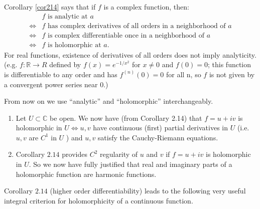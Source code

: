 \documentclass[egregdoesnotlikesansseriftitles,a4paper]{scrartcl}
\begin{document}
Corollary \ref{cor214} says that if $f$ is a complex function, then:
\begin{align*}
     & f\text{ is analytic at } a\\
     \iff & f \text{ has complex derivatives of all orders in a
     neighborhood of } a\\
     \iff & f \text{ is complex differentiable once in a
     neighborhood of } a\\
     \iff & f \text{ is holomorphic at } a.
\end{align*}
For real functions, existence of derivatives of all orders does not imply analyticity.
(e.g. $f: \mathbb{R}\rightarrow R$ defined by $f (x)=e^{-1/x^2}$ for $x \neq 0$ and $f (0)=0$; this function is differentiable to any order and has $f^{(n)}(0)=0$ for all n, so $f$ is not given by a convergent power series near 0.)
\begin{notation}
     From now on we use “analytic” and “holomorphic” interchangeably.
\end{notation}
\begin{remarks}
      \begin{enumerate}
          \item Let $U \subset \mathbb{C}$ be open. We now have (from Corollary 2.14) that $f=u+i v$ is holomorphic in $U \Longleftrightarrow u, v$ have continuous (first) partial derivatives in $U$ (i.e. $u, v$ are $C^{1}$ in $U$ ) and $u, v$ satisfy the Cauchy-Riemann equations.
          \item Corollary $2.14$ provides $C^{2}$ regularity of $u$ and $v$ if $f=u+i v$ is holomorphic in $U$. So we now have fully justified that real and imaginary parts of a holomorphic function are harmonic functions.
      \end{enumerate}
\end{remarks}

Corollary $2.14$ (higher order differentiability) leads to the following very useful integral criterion for holomorphicity of a continuous function.
\end{document}
